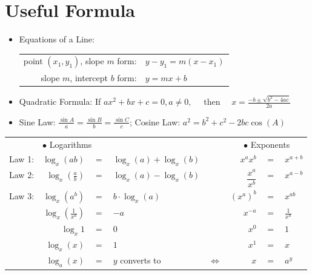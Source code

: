 \chapter*{Useful Formula}
\begin{itemize}
	\item Equations of a Line:
\begin{center}\begin{tabular}{rl}
		point $(x_1,y_1)$, slope $m$ form:&$y-y_1 = m(x - x_1)$\\
		slope $m$, intercept $b$ form:&$y=mx+b$
	\end{tabular}\end{center}
	\item Quadratic Formula:
	If $ax^2+bx+c=0$,\,$a\ne0,\quad$ then $\displaystyle\quad x = \frac{-b\pm \sqrt{b^2-4ac}}{2a}$
	\item Sine Law: $\frac{\sin A}{a}= \frac{\sin B}{b}=\frac{\sin C}{c}$; \hspace{0.2cm}Cosine Law: $a^2=b^2+c^2-2bc\cos(A)$
\end{itemize}
{\hspace*{0.55cm}
		\renewcommand{\arraystretch}{1.2}
		\begin{tabular}{lrclcrcl}
			&\multicolumn{3}{l}{\phantom{aaaa}$\bullet$ Logarithms}& &\multicolumn{3}{c}{$\bullet$ Exponents}\\
			\cmidrule{1-4}\cmidrule{6-8}
			Law 1: &$ \log_x(ab) $&$=$&$ \log_x(a)+\log_x(b)  $&\hspace{1cm} &$x^a x^b$&$=$&$x^{a+b} $\\
			Law 2: &$ \log_x\left(\frac{a}{b}\right) $&$=$&$  \log_x(a)-\log_x(b) $& &$\dfrac{x^a}{x^b}$&$=$&$x^{a-b}  $\\
			Law 3: &$ \log_x(a^b) $&$=$&$ b\cdot\log_x(a)   $& &$(x^a)^b $&$=$&$x^{ab} $\\
			\cmidrule{1-4}\cmidrule{6-8}
			&$  \log_{x}\left(\frac{1}{x^a}\right) $&$=$&$-a   $& &$x^{-a} $&$=$&$\frac{1}{x^a} $\\
			&$ \log_{x}1  $&$=$&$ 0  $& &$x^0 $&$=$&$1 $\\
			&$ \log_x(x) $&$=$&$  1 $& &$x^1 $&$=$&$x $\\
			\bottomrule
			&$ \log_a(x) $&$=$&$y$\hspace{0.5cm} converts to& $\Leftrightarrow$ &$x $&$=$&$a^y $\\
			\bottomrule
		\end{tabular}\\
}
